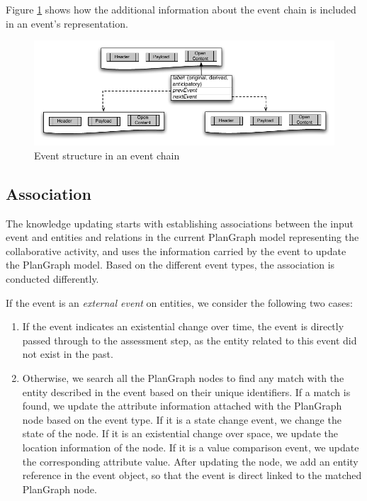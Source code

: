  Figure \ref{fig:event_chain_structure} shows how the additional information about the event chain is included in an event's representation. 

\begin{figure}[htbp] %
	\centering
	\includegraphics{event_chain_structure.pdf} 
	\caption{Event structure in an event chain}
	\label{fig:event_chain_structure}
\end{figure}

\subsection{Association} %
\label{sub:association}
The knowledge updating starts with establishing associations between the input event and entities and relations in the current PlanGraph model representing the collaborative activity, and uses the information carried by the event to update the PlanGraph model. Based on the different event types, the association is conducted differently.

If the event is an \emph{external event} on entities, we consider the following two cases:
\begin{enumerate}
	\item If the event indicates an existential change over time, the event is directly passed through to the assessment step, as the entity related to this event did not exist in the past.
	\item Otherwise, we search all the PlanGraph nodes to find any match with the entity described in the event based on their unique identifiers. If a match is found, we update the attribute information attached with the PlanGraph node based on the event type. If it is a state change event, we change the state of the node. If it is an existential change over space, we update the location information of the node. If it is a value comparison event, we update the corresponding attribute value. After updating the node, we add an entity reference in the event object, so that the event is direct linked to the matched PlanGraph node.
\end{enumerate}

